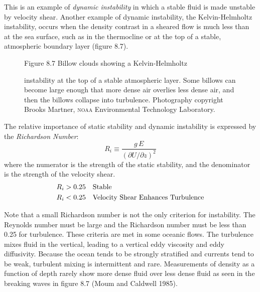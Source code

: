 This is an example of \textit{dynamic
  instability} in which a stable fluid is made unstable by
velocity shear.  Another example of dynamic instability, the
Kelvin-Helmholtz instability, occurs when the density contrast in a
sheared flow is much less than at the sea surface, such as in the
thermocline or at the top of a stable, atmospheric
boundary layer (figure 8.7).
\begin{figure}[t!]
\footnotesize
Figure 8.7 Billow clouds showing a Kelvin-Helmholtz
\rule{0mm}{4ex}instability at the top of a stable atmospheric
layer. Some billows can become large enough that more dense air
overlies less dense air, and then the billows collapse into
turbulence. Photography copyright Brooks
Martner, \textsc{noaa} Environmental Technology Laboratory.
\label{fig:helmholtz}
\vspace{-3ex}
\end{figure}

The relative importance of static stability and dynamic instability is
expressed by the \textit{Richardson Number}:
\begin{equation}
\boxed{R_i\equiv\frac{g\,E}{(\partial{U}/\partial{z})^2} }
\end{equation}
where the numerator is the strength of the static stability, and the
denominator is the strength of the velocity shear.
\begin{align}
R_i &>0.25 \quad \text{Stable} \notag \\
R_i &<0.25 \quad \text{Velocity Shear Enhances Turbulence} \notag
\end{align}

Note that a small Richardson number is not the only criterion for
instability.  The Reynolds number must be large and the Richardson
number must be less than 0.25 for turbulence. These criteria are met
in some oceanic flows. The turbulence mixes fluid in the vertical,
leading to a vertical eddy viscosity and eddy diffusivity. Because the
ocean tends to be strongly stratified and currents tend to be weak,
turbulent mixing is intermittent and rare. Measurements of density as
a function of depth rarely show more dense fluid over less dense fluid
as seen in the breaking waves in figure 8.7 (Moum and Caldwell 1985).

